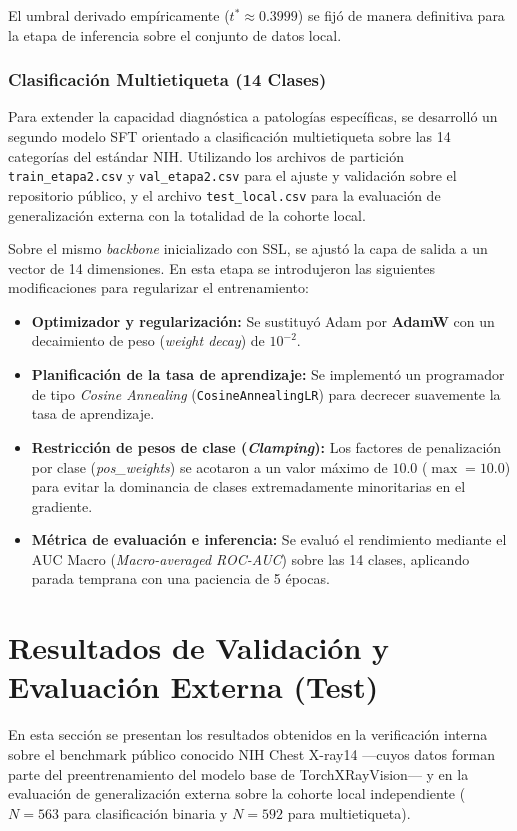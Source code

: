 \documentclass[../main.tex]{subfiles}
\begin{document}
El umbral derivado empíricamente ($t^* \approx 0.3999$) se fijó de manera definitiva para la etapa de inferencia sobre el conjunto de datos local.

\subsubsection{Clasificación Multietiqueta (14 Clases)}
Para extender la capacidad diagnóstica a patologías específicas, se desarrolló un segundo modelo SFT orientado a clasificación multietiqueta sobre las 14 categorías del estándar NIH. Utilizando los archivos de partición \texttt{train\_etapa2.csv} y \texttt{val\_etapa2.csv} para el ajuste y validación sobre el repositorio público, y el archivo \texttt{test\_local.csv} para la evaluación de generalización externa con la totalidad de la cohorte local.

Sobre el mismo \textit{backbone} inicializado con SSL, se ajustó la capa de salida a un vector de 14 dimensiones. En esta etapa se introdujeron las siguientes modificaciones para regularizar el entrenamiento:
\begin{itemize}
    \item \textbf{Optimizador y regularización:} Se sustituyó Adam por \textbf{AdamW} con un decaimiento de peso (\textit{weight decay}) de $10^{-2}$.
    \item \textbf{Planificación de la tasa de aprendizaje:} Se implementó un programador de tipo \textit{Cosine Annealing} (\texttt{CosineAnnealingLR}) para decrecer suavemente la tasa de aprendizaje.
    \item \textbf{Restricción de pesos de clase (\textit{Clamping}):} Los factores de penalización por clase (\textit{pos\_weights}) se acotaron a un valor máximo de $10.0$ ($\max = 10.0$) para evitar la dominancia de clases extremadamente minoritarias en el gradiente.
    \item \textbf{Métrica de evaluación e inferencia:} Se evaluó el rendimiento mediante el AUC Macro (\textit{Macro-averaged ROC-AUC}) sobre las 14 clases, aplicando parada temprana con una paciencia de 5 épocas.
\end{itemize}

\section{Resultados de Validación y Evaluación Externa (Test)}

En esta sección se presentan los resultados obtenidos en la verificación interna sobre el benchmark público conocido NIH Chest X-ray14 —cuyos datos forman parte del preentrenamiento del modelo base de TorchXRayVision— y en la evaluación de generalización externa sobre la cohorte local independiente ($N=563$ para clasificación binaria y $N=592$ para multietiqueta).
\end{document}
